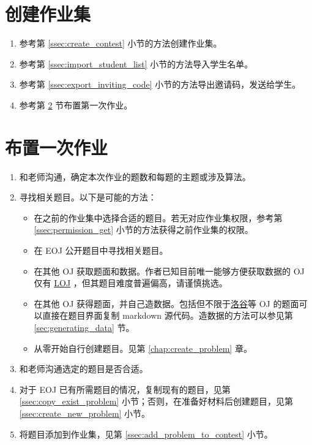 \documentclass[oneside]{book}
\begin{document}
\section{创建作业集}

\begin{enumerate}
  \item 参考第 \ref{ssec:create_contest} 小节的方法创建作业集。
  \item 参考第 \ref{ssec:import_student_list} 小节的方法导入学生名单。
  \item 参考第 \ref{ssec:export_inviting_code} 小节的方法导出邀请码，发送给学生。
  \item 参考第 \ref{sec:set_homework} 节布置第一次作业。
\end{enumerate}

\section{布置一次作业}

\label{sec:set_homework}

\begin{enumerate}
  \item 和老师沟通，确定本次作业的题数和每题的主题或涉及算法。
  \item 寻找相关题目。以下是可能的方法：
  \begin{itemize}
    \item 在之前的作业集中选择合适的题目。若无对应作业集权限，参考第 \ref{ssec:permission_get} 小节的方法获得之前作业集的权限。
    \item 在 EOJ 公开题目中寻找相关题目。
    \item 在其他 OJ 获取题面和数据。作者已知目前唯一能够方便获取数据的 OJ 仅有 \href{https://loj.ac/}{LOJ} ，但其题目难度普遍偏高，请谨慎挑选。
    \item 在其他 OJ 获得题面，并自己造数据。包括但不限于\href{https://www.luogu.com.cn/}{洛谷}等 OJ 的题面可以直接在题目界面复制 markdown 源代码。造数据的方法可以参见第 \ref{sec:generating_data} 节。
    \item 从零开始自行创建题目。见第 \ref{chap:create_problem} 章。
  \end{itemize}
  \item 和老师沟通选定的题目是否合适。
  \item 对于 EOJ 已有所需题目的情况，复制现有的题目，见第 \ref{ssec:copy_exist_problem} 小节；否则，在准备好材料后创建题目，见第 \ref{ssec:create_new_problem} 小节。
  \item 将题目添加到作业集，见第 \ref{ssec:add_problem_to_contest} 小节。
\end{enumerate}
\end{document}
